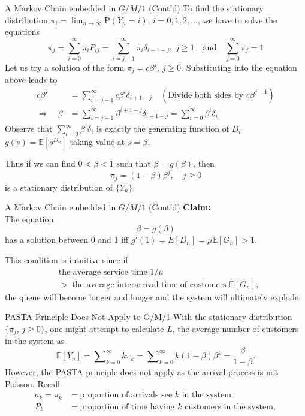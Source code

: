 \documentclass[letterpaper,handout]{beamer}
\def\Sum{\sum\nolimits}
\def\p{\mathrm P}
\def\E{\mathbb E}
\begin{document}
\begin{frame}{A Markov Chain embedded in $G/M/1$ (Cont'd)}
To find the stationary distribution $\pi_i=\lim_{n\to\infty}\p(Y_n=i)$, $i=0,1,2,\ldots$,
we have to solve the equations
$$
\pi_j = \sum_{i=0}^{\infty}\pi_i P_{ij}=\sum_{i=j-1}^{\infty}\pi_i \delta_{i+1-j},\; j\ge 1\quad
\mbox{and}\quad\sum_{j=0}^{\infty}\pi_j = 1
$$
Let us try a solution of the form $\pi_j=c\beta^j$, $j\ge 0$.
Substituting into the equation above leads to
\begin{align*}
c\beta^j &=\Sum_{i=j-1}^{\infty}c\beta^i \delta_{i+1-j}\quad (\mbox{Divide both sides by }c\beta^{j-1})\\
\Rightarrow\quad
\beta &= \Sum_{i=j-1}^{\infty}\beta^{i+1-j} \delta_{i+1-j} = \Sum_{i=0}^{\infty}\beta^{i}\delta_{i}
\end{align*}
Observe that $\Sum_{i=0}^{\infty}\beta^{i}\delta_{i}$ is exactly the generating function of $D_n$
$g(s)=\E[s^{D_n}]$ taking value at $s=\beta.$\par
Thus if we can find $0<\beta<1$ such that $\beta = g(\beta)$, then
$$\pi_j = (1-\beta)\beta^j,\quad j\ge 0$$ is a stationary distribution of $\{Y_n\}.$
\end{frame}
\begin{frame}{A Markov Chain embedded in $G/M/1$ (Cont'd)}
\textbf{Claim: } \\

The equation $$\beta = g(\beta)$$ has a solution between 0 and 1 iff $g'(1)=E[D_n]=\mu\E[G_n]>1$.

\vfill
This condition is intuitive since if
\begin{align*}
&\mbox{the average service time }1/\mu \\
&>\;\mbox{the average interarrival time of customers }\E[G_n],
\end{align*}
the queue will become longer and longer and the system will ultimately explode.
\end{frame}
\begin{frame}{PASTA Principle Does Not Apply to G/M/1}
With the stationary distribution $\{\pi_j,\, j\ge 0\}$,
one might attempt to calculate $L$, the average number of customers in the system as
$$\E[Y_n]=\Sum_{k=0}^{\infty}k \pi_k = \Sum_{k=0}^{\infty} k(1-\beta)\beta^k =\frac{\beta}{1-\beta}.$$
However, the PASTA principle does not apply as the arrival process is not Poisson.
Recall
\begin{align*}
a_k=\pi_k&=\mbox{proportion of arrivals see $k$ in the system}\\
  P_k&=\mbox{proportion of time having $k$ customers in the system},
\end{align*}
\end{frame}
\end{document}
